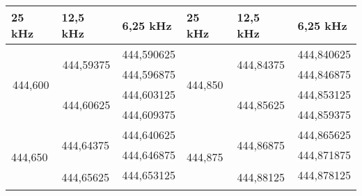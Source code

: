 \begin{table}[h]
	\centering
	\begin{tabular}{|l|l|l|l|l|l|}
		\hline
		\textbf{25 kHz}                                & \textbf{12,5 kHz}                               & \textbf{6,25 kHz}               & \textbf{25 kHz}                               & \textbf{12,5 kHz}                               & \textbf{6,25 kHz}               \\ \hline
		\multicolumn{1}{|c|}{\multirow{4}{*}{444,600}} & \multicolumn{1}{c|}{\multirow{2}{*}{444,59375}} & \multicolumn{1}{c|}{444,590625} & \multicolumn{1}{l|}{\multirow{4}{*}{444,850}} & \multicolumn{1}{l|}{\multirow{2}{*}{444,84375}} & \multicolumn{1}{l|}{444,840625} \\ \cline{3-3}\cline{6-6}
		\multicolumn{1}{|c|}{}                         & \multicolumn{1}{c|}{}                           & \multicolumn{1}{c|}{444,596875} & \multicolumn{1}{l|}{}                         & \multicolumn{1}{l|}{}                           & \multicolumn{1}{l|}{444,846875} \\ \cline{2-3}\cline{5-6}
		\multicolumn{1}{|c|}{}                         & \multicolumn{1}{c|}{\multirow{2}{*}{444,60625}} & \multicolumn{1}{c|}{444,603125} & \multicolumn{1}{l|}{}                         & \multicolumn{1}{l|}{\multirow{2}{*}{444,85625}} & \multicolumn{1}{l|}{444,853125} \\ \cline{3-3}\cline{6-6}
		\multicolumn{1}{|c|}{}                         & \multicolumn{1}{c|}{}                           & \multicolumn{1}{c|}{444,609375} & \multicolumn{1}{l|}{}                         & \multicolumn{1}{l|}{}                           & \multicolumn{1}{l|}{444,859375} \\ \hline
		\multirow{4}{*}{444,650}                       & \multirow{2}{*}{444,64375}                      & 444,640625                      & \multicolumn{1}{l|}{\multirow{4}{*}{444,875}} & \multicolumn{1}{l|}{\multirow{2}{*}{444,86875}} & \multicolumn{1}{l|}{444,865625} \\ \cline{3-3}\cline{6-6}
		                                               &                                                 & 444,646875                      & \multicolumn{1}{l|}{}                         & \multicolumn{1}{l|}{}                           & \multicolumn{1}{l|}{444,871875} \\ \cline{2-3}\cline{5-6}
		                                               & \multirow{2}{*}{444,65625}                      & 444,653125                      & \multicolumn{1}{l|}{}                         & \multicolumn{1}{l|}{\multirow{2}{*}{444,88125}} & \multicolumn{1}{l|}{444,878125} \\ \cline{3-3}\cline{6-6}

\end{tabular}
\end{table}
